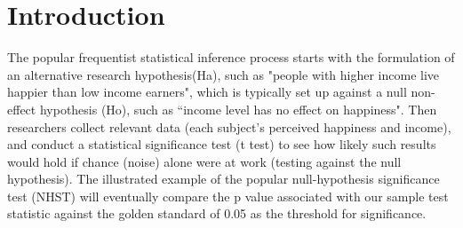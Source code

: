 \documentclass[inte,blindrev]{informs3}
\begin{document}
%


\section{Introduction}

The popular frequentist statistical inference process starts with the formulation of an alternative research hypothesis(Ha), such as "people with higher income live happier than low income earners", which is typically set up against a null non-effect hypothesis (Ho), such as ``income level has no effect on happiness". Then researchers collect relevant data (each subject's perceived happiness and income), and conduct a statistical significance test (t test) to see how likely such results would hold if chance (noise) alone were at work (testing against the null hypothesis). The illustrated example of the popular null-hypothesis significance test (NHST) will eventually compare the p value associated with our sample test statistic against the golden standard of 0.05 as the threshold for significance. 
\end{document}
